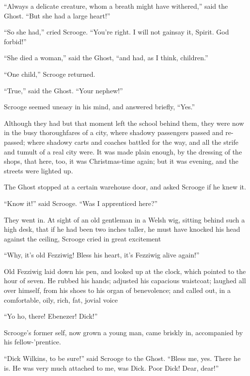 \documentclass[paper=5.5in:8.5in,BCOR=7mm,twoside,DIV=calc,12pt,usegeometry]{scrbook} %
\begin{document}
\enquote{Always a delicate creature, whom a breath might have withered,} said the Ghost. \enquote{But she had a large heart!}

\enquote{So she had,} cried Scrooge. \enquote{You're right. I will not gainsay it, Spirit. God forbid!}

\enquote{She died a woman,} said the Ghost, \enquote{and had, as I think, children.}

\enquote{One child,} Scrooge returned.

\afterpage{\clearpage}

\enquote{True,} said the Ghost. \enquote{Your nephew!}

Scrooge seemed uneasy in his mind, and answered briefly, \enquote{Yes.}

Although they had but that moment left the school behind them, they were now in the busy thoroughfares of a city, where shadowy passengers passed and re-passed; where shadowy carts and coaches battled for the way, and all the strife and tumult of a real city were. It was made plain enough, by the dressing of the shops, that here, too, it was Christmas-time again; but it was evening, and the streets were lighted up.

The Ghost stopped at a certain warehouse door, and asked \newline Scrooge if he knew it.

\enquote{Know it!} said Scrooge. \enquote{Was I apprenticed here?}

They went in. At sight of an old gentleman in a Welsh wig, sitting behind such a high desk, that if he had been two inches taller, he must have knocked his head against the ceiling, Scrooge cried in great excitement\textemdash 

\enquote{Why, it's old Fezziwig! Bless his heart, it's Fezziwig alive again!}

Old Fezziwig laid down his pen, and looked up at the clock, which pointed to the hour of seven. He rubbed his hands; adjusted his capacious waistcoat; laughed all over himself, from his shoes to his organ of benevolence; and called out, in a comfortable, oily, rich, fat, jovial voice\textemdash 

\enquote{Yo ho, there! Ebenezer! Dick!}

Scrooge's former self, now grown a young man, came briskly in, accompanied by his fellow-'prentice.

\enquote{Dick Wilkins, to be sure!} said Scrooge to the Ghost. \enquote{Bless me, yes. There he is. He was very much attached to me, was Dick. Poor Dick! Dear, dear!}
\end{document}
